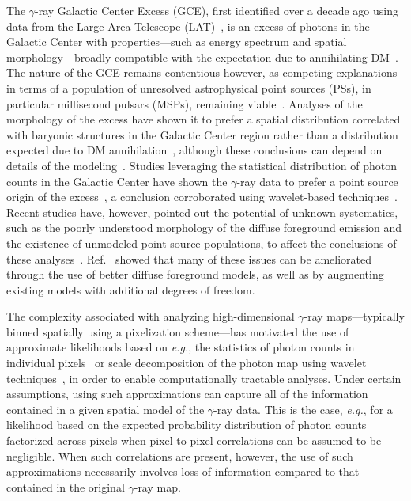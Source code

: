 \documentclass[prd,aps,10pt,nofootinbib,twocolumn,superscriptaddress,preprintnumbers,balancelastpage,longbibliography,floatfix]{revtex4-2}
\newcommand{\changes}[1]{{{\color{red}#1}}}
\begin{document}
The \Fermi $\gamma$-ray Galactic Center Excess (GCE), first identified over a decade ago using data from the \Fermi Large Area Telescope (LAT)~\cite{Atwood:2009ez}, is an excess of photons in the Galactic Center with properties---such as energy spectrum and spatial morphology---broadly compatible with \changes{the} expectation due to annihilating DM~\cite{Goodenough:2009gk,Hooper:2010mq,Boyarsky:2010dr,Hooper:2011ti,Abazajian:2012pn,Hooper:2013rwa,Gordon:2013vta,Abazajian:2014fta,Daylan:2014rsa,Calore:2014xka,Abazajian:2014hsa,Fermi-LAT:2015sau,Linden:2016rcf,Macias:2016nev,Clark:2016mbb}. The nature of the GCE remains contentious however, \changes{as} competing explanations in terms of a population of unresolved astrophysical point sources (PSs), in particular millisecond pulsars (MSPs), remaining viable~\cite{Abazajian:2014fta,Abazajian:2010zy,Hooper:2013nhl,Calore:2014oga,Cholis:2014lta,Petrovic:2014xra,Yuan:2014yda,Brandt:2015ula,Gautam:2021wqn,Ploeg:2020jeh}. Analyses of the morphology of the excess have shown it to prefer a spatial distribution correlated with baryonic structures in the Galactic Center region rather than a distribution expected due to DM annihilation~\cite{Macias:2016nev,Macias:2019omb,Bartels:2017vsx}, although these conclusions can depend on details of the modeling~\cite{DiMauro:2020rcr,DiMauro:2021raz}. Studies leveraging the statistical distribution of photon counts in the Galactic Center have shown the $\gamma$-ray data to prefer a point source origin of the excess~\cite{Lee:2015fea,Bartels:2015aea,Buschmann:2020adf,Chang:2019ars}, a conclusion corroborated using wavelet-based techniques~\cite{Bartels:2015aea}. Recent studies have, however, pointed out the potential of unknown systematics, such as the poorly understood morphology of the diffuse foreground emission and the existence of unmodeled point source populations, to affect the conclusions of these analyses~\cite{Leane:2019xiy}. Ref.~\cite{Buschmann:2020adf} showed that many of these issues can be ameliorated through the use of better diffuse foreground models, as well as by augmenting existing models with additional degrees of freedom.

The complexity associated with analyzing high-dimensional $\gamma$-ray maps---typically binned spatially using a pixelization scheme---has motivated the use of approximate likelihoods based on \emph{e.g.}, the statistics of photon counts in individual pixels~\cite{Malyshev:2011zi,Lee:2014mza,Lee:2015fea} or scale decomposition of the photon map using wavelet techniques~\cite{Bartels:2015aea,Balaji:2018rwz,McDermott:2015ydv,Zhong:2019ycb}, in order to enable computationally tractable analyses. Under certain assumptions, using such approximations can capture all of the information contained in a given spatial model of the $\gamma$-ray data. This is the case, \emph{e.g.}, for a likelihood based on the expected probability distribution of photon counts factorized across pixels when pixel-to-pixel correlations can be assumed to be negligible. When such correlations are present, however, the use of such approximations necessarily involves loss of information compared to that contained in the original $\gamma$-ray map.
\end{document}

